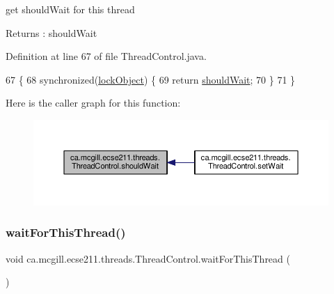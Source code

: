 get should\+Wait for this thread \begin{DoxyReturn}{Returns}
\+: should\+Wait 
\end{DoxyReturn}


Definition at line 67 of file Thread\+Control.\+java.


\begin{DoxyCode}
67                               \{
68     \textcolor{keyword}{synchronized}(\hyperlink{classca_1_1mcgill_1_1ecse211_1_1threads_1_1_thread_control_ab20c44ff2dafab8981c42fa8bf634dfc}{lockObject}) \{
69       \textcolor{keywordflow}{return} \hyperlink{classca_1_1mcgill_1_1ecse211_1_1threads_1_1_thread_control_a9c3896500e86e402b8019e1be6500621}{shouldWait};
70     \}
71   \}
\end{DoxyCode}
Here is the caller graph for this function\+:\nopagebreak
\begin{figure}[H]
\begin{center}
\leavevmode
\includegraphics[width=350pt]{classca_1_1mcgill_1_1ecse211_1_1threads_1_1_thread_control_a9c3896500e86e402b8019e1be6500621_icgraph}
\end{center}
\end{figure}
\mbox{\label{classca_1_1mcgill_1_1ecse211_1_1threads_1_1_thread_control_a6a25ccb2d8916b8e6cc4b3bb0e9d2ed7}} 
\subsubsection{\texorpdfstring{wait\+For\+This\+Thread()}{waitForThisThread()}}
{\footnotesize\ttfamily void ca.\+mcgill.\+ecse211.\+threads.\+Thread\+Control.\+wait\+For\+This\+Thread (\begin{DoxyParamCaption}{ }\end{DoxyParamCaption})}

